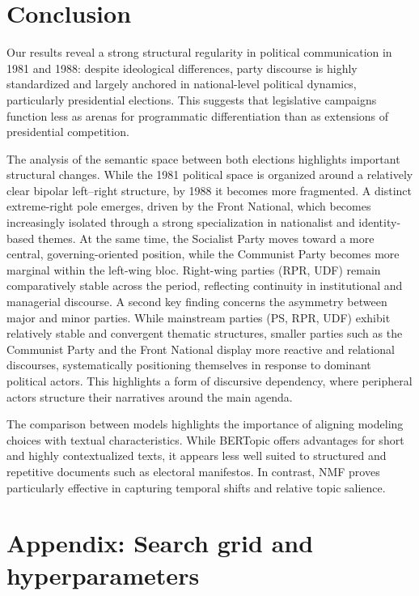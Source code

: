 \documentclass{article}
\begin{document}
\section{Conclusion}
Our results reveal a strong structural regularity in political communication in 1981 and 1988: despite ideological differences, party discourse is highly standardized and largely anchored in national-level political dynamics, particularly presidential elections. This suggests that legislative campaigns function less as arenas for programmatic differentiation than as extensions of presidential competition.

The analysis of the semantic space between both elections highlights important structural changes. While the 1981 political space is organized around a relatively clear bipolar left–right structure, by 1988 it becomes more fragmented. A distinct extreme-right pole emerges, driven by the Front National, which becomes increasingly isolated through a strong specialization in nationalist and identity-based themes. At the same time, the Socialist Party moves toward a more central, governing-oriented position, while the Communist Party becomes more marginal within the left-wing bloc. Right-wing parties (RPR, UDF) remain comparatively stable across the period, reflecting continuity in institutional and managerial discourse. A second key finding concerns the asymmetry between major and minor parties. While mainstream parties (PS, RPR, UDF) exhibit relatively stable and convergent thematic structures, smaller parties such as the Communist Party and the Front National display more reactive and relational discourses, systematically positioning themselves in response to dominant political actors. This highlights a form of discursive dependency, where peripheral actors structure their narratives around the main agenda.

The comparison between models highlights the importance of aligning modeling choices with textual characteristics. While BERTopic offers advantages for short and highly contextualized texts, it appears less well suited to structured and repetitive documents such as electoral manifestos. In contrast, NMF proves particularly effective in capturing temporal shifts and relative topic salience.
\newpage

\appendix

\section{Appendix: Search grid and hyperparameters}
\end{document}
